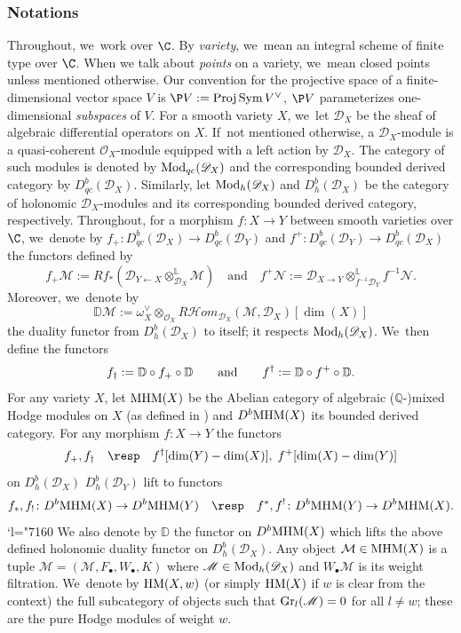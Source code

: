 \documentclass[JEP,XML,SOM,Unicode,published]{cedram}
\let\mathds\mathbb
\newcommand{\Changel}{\mathcode`l="7160}
\newcommand{\sbullet}{{\scriptscriptstyle\bullet}}
\newcommand{\dQ}{{\mathds Q}}\let\Q\dQ
\newcommand{\bD}{{\mathbb D}}\let\mbd\bD
\newcommand{\cD}{\mathscr{D}}
\newcommand{\cH}{\mathcal{H}}
\newcommand{\cM}{\mathcal{M}}
\newcommand{\cO}{\mathcal{O}}\let\O\cO
\DeclareMathOperator{\gr}{\textup{Gr}}
\DeclareMathOperator{\Proj}{\textup{Proj}}
\DeclareMathOperator{\Sym}{\textup{Sym}}
\newcommand{\MHM}{\textup{MHM}}
\newcommand{\HM}{\textup{HM}}
\begin{document}
\subsubsection*{Notations}
Throughout, we~work over $\C$. By \emph{variety}, we~mean an integral scheme of finite type over $\C$. When we talk about \emph{points} on a variety, we~mean closed points unless mentioned otherwise. Our convention for the projective space of a finite-dimensional vector space $V$ is $\P V := \Proj \Sym V^\vee$, \ie $\P V$ parameterizes one-dimensional \emph{subspaces} of $V$.
For a smooth variety $X$, we~let $\mathscr{D}_X$ be the sheaf of algebraic differential operators on $X$. If~not mentioned otherwise, a $\mathscr{D}_X$\nobreakdash-mod\-ule is a
quasi-coherent $\cO_X$\nobreakdash-mod\-ule equipped with a left action
by $\mathscr{D}_X$. The category of such modules is denoted by $\textup{Mod}_{qc}(\mathscr{D}_X)$ and the corresponding bounded derived category by $D_{qc}^b(\mathscr{D}_X)$.
Similarly, let $\textup{Mod}_{h}(\mathscr{D}_X)$ and $D_{h}^b(\mathscr{D}_X)$ be the category of holonomic $\mathscr D_X$\nobreakdash-mod\-ules and its corresponding bounded derived category, respectively.
Throughout, for a morphism $f \colon X \to Y$ between smooth varieties over $\C$, we~denote by $f_+ \colon D_{qc}^b(\mathscr D_X) \to D_{qc}^b(\mathscr D_Y)$ and $f^+ \colon D_{qc}^b(\mathscr D_Y) \to D_{qc}^b(\mathscr D_X)$ the functors defined by
\[
f_+ \mathscr M := Rf_*(\mathscr D_{Y \leftarrow X} \otimes^{\mathbb L}_{\mathscr D_X} \mathscr M)
\quad \text{and} \quad
f^+\mathscr N := \mathscr D_{X \to Y} \otimes^{\mathbb L}_{f^{-1} \mathscr D_Y} f^{-1} \mathscr N.
\]
Moreover, we~denote by
\[
\bD \mathscr{M} := \omega^\vee_X\otimes_{\cO_X} R{\cH\!}om_{\cD_X}(\mathscr{M},\cD_X)[\dim(X)]
\]
the duality functor from $D^b_h(\cD_X)$ to itself; it respects
$\textup{Mod}_h(\cD_X)$. We~then define the functors
\[
f_\dag:=\bD\circ f_+ \circ \bD
\quad\quad
\textup{and}
\quad\quad
f^\dag:=\bD\circ f^+ \circ \bD.
\]
For any variety $X$, let $\MHM(X)$ be the Abelian category of algebraic
($\dQ$\nobreakdash-)mixed Hodge modules on $X$ (as defined in \cite{Saito1, SaitoMHM}) and $D^b \MHM(X)$ its bounded derived category. For any morphism $f\colon X\to Y$ the functors
\[
f_+, f_\dag\quad \text{\resp}\quad f^\dag[\dim(Y)-\nobreak\dim(X)],\; f^+[\dim(X)-\dim(Y)]
\]
on $D^b_{h}(\mathscr{D}_X)$ \resp $D^b_{h}(\mathscr{D}_Y)$ lift to functors
\[
f_*, f_!\colon D^b\MHM(X)\to D^b\MHM(Y)
\quad
\textup{\resp}
\quad
f^*, f^!\colon D^b\MHM(Y)\to D^b\MHM(X).
\]
\Changel
We also denote by $\bD$ the functor on $D^b \MHM(X)$ which lifts the above defined holonomic duality functor on $D^b_h(\cD_X)$.
Any object $\cM\in \MHM(X)$ is a tuple
$\cM=(\mathscr{M},F_\sbullet, W_\sbullet, K)$ where
$\mathscr{M}\in\textup{Mod}_h(\mathscr{D}_X)$ and $W_\sbullet\mathscr{M}$ is its weight filtration. We~denote by
$\HM(X,w)$ (or simply $\HM(X)$ if $w$ is clear from the context) the full subcategory of objects such that
$\gr_l(\mathscr{M})=0$ for all $l\neq w$; these are the pure Hodge modules of weight $w$.
\end{document}

